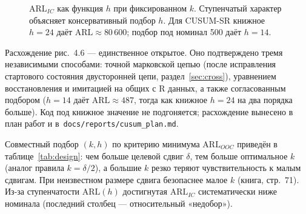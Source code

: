 \documentclass[11pt,a4paper]{article}
\newcommand{\ARL}{\mathrm{ARL}}
\begin{document}
\begin{figure}[htbp]\centering
{}
\caption{$\ARL_{IC}$ как функция $h$ при фиксированном $k$. Ступенчатый
характер объясняет консервативный подбор $h$. Для CUSUM-SR книжное
$h=24$ даёт $\ARL\approx80\,600$; подбор под номинал 500 даёт $h=14$.}
\label{fig:arlh}
\end{figure}

\noindent
Расхождение рис.~4.6 --- единственное открытое. Оно подтверждено тремя
независимыми способами: точной марковской цепью (после исправления
стартового состояния двусторонней цепи, раздел~\ref{sec:cross}),
уравнением восстановления и имитацией на общих с R данных, а также
согласованным подбором ($h=14$ даёт $\ARL\approx487$, тогда как книжное
$h=24$ на два порядка больше). Код под книжное значение не подгоняется;
расхождение вынесено в план работ и в~\texttt{docs/reports/cusum\_plan.md}.

Совместный подбор $(k,h)$ по критерию минимума $\ARL_{OOC}$ приведён в
таблице~\ref{tab:design}: чем больше целевой сдвиг $\delta$, тем больше
оптимальное $k$ (аналог правила $k=\delta/2$), а большие $k$ резко теряют
чувствительность к малым сдвигам. При неизвестном размере сдвига
безопаснее малое $k$ (книга, стр.~71). Из-за ступенчатости $\ARL(h)$
достигнутая $\ARL_{IC}$ систематически ниже номинала (последний столбец
--- относительный «недобор»).
\end{document}

